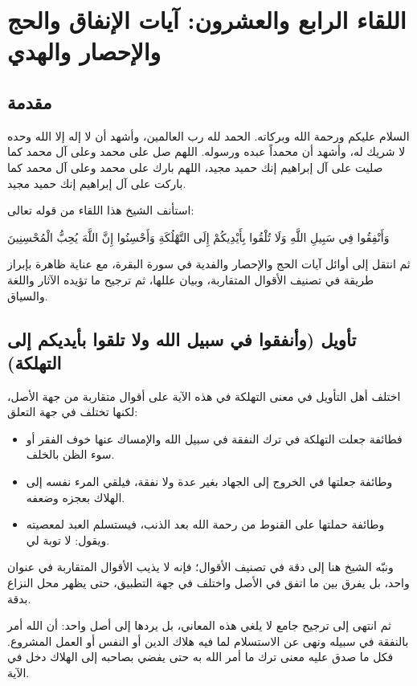 \chapter{اللقاء الرابع والعشرون: آيات الإنفاق والحج والإحصار والهدي}

\section{مقدمة}
السلام عليكم ورحمة الله وبركاته. الحمد لله رب العالمين، وأشهد أن لا إله إلا الله وحده لا شريك له، وأشهد أن محمداً عبده ورسوله. اللهم صل على محمد وعلى آل محمد كما صليت على آل إبراهيم إنك حميد مجيد، اللهم بارك على محمد وعلى آل محمد كما باركت على آل إبراهيم إنك حميد مجيد.

استأنف الشيخ هذا اللقاء من قوله تعالى: \begin{ayah}وَأَنْفِقُوا فِي سَبِيلِ اللَّهِ وَلَا تُلْقُوا بِأَيْدِيكُمْ إِلَى التَّهْلُكَةِ وَأَحْسِنُوا إِنَّ اللَّهَ يُحِبُّ الْمُحْسِنِينَ\end{ayah} ثم انتقل إلى أوائل آيات الحج والإحصار والفدية في سورة البقرة، مع عناية ظاهرة بإبراز طريقة  في تصنيف الأقوال المتقاربة، وبيان عللها، ثم ترجيح ما تؤيده الآثار واللغة والسياق.

\separator

\section{تأويل (وأنفقوا في سبيل الله ولا تلقوا بأيديكم إلى التهلكة)}
 اختلف أهل التأويل في معنى التهلكة في هذه الآية على أقوال متقاربة من جهة الأصل، لكنها تختلف في جهة التعلق:
\begin{itemize}
    \item فطائفة جعلت التهلكة في ترك النفقة في سبيل الله والإمساك عنها خوف الفقر أو سوء الظن بالخلف.
    \item وطائفة جعلتها في الخروج إلى الجهاد بغير عدة ولا نفقة، فيلقي المرء نفسه إلى الهلاك بعجزه وضعفه.
    \item وطائفة حملتها على القنوط من رحمة الله بعد الذنب، فيستسلم العبد لمعصيته ويقول: لا توبة لي.
\end{itemize}

ونبّه الشيخ هنا إلى دقة  في تصنيف الأقوال؛ فإنه لا يذيب الأقوال المتقاربة في عنوان واحد، بل يفرق بين ما اتفق في الأصل واختلف في جهة التطبيق، حتى يظهر محل النزاع بدقة.

ثم انتهى  إلى ترجيح جامع لا يلغي هذه المعاني، بل يردها إلى أصل واحد: أن الله أمر بالنفقة في سبيله ونهى عن الاستسلام لما فيه هلاك الدين أو النفس أو العمل المشروع. فكل ما صدق عليه معنى ترك ما أمر الله به حتى يفضي بصاحبه إلى الهلاك دخل في الآية.

